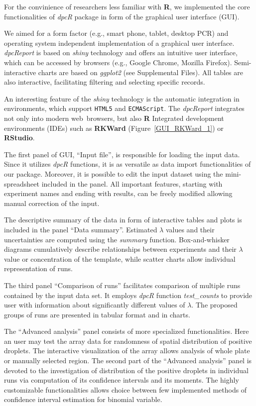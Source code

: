 \documentclass[a4,center,fleqn]{NAR}
\begin{document}
For the convinience of researchers less familiar with \textbf{R}, we 
implemented the core functionalities of \textit{dpcR} package in form of 
the graphical user interface (GUI).

We aimed for a form factor (e.g., smart phone, tablet, desktop PCR) and 
operating system independent implementation of a graphical user interface. 
\textit{dpcReport} is based on \textit{shiny} technology and offers an intuitive 
user interface, which can be accessed by browsers (e.g., Google Chrome, Mozilla 
Firefox). Semi-interactive charts are based on \textit{ggplot2} (see 
Supplemental Files). All tables are also interactive, facilitating filtering 
and selecting specific records.

An interesting feature of the \textit{shiny} technology is the automatic 
integration in environments, which support \texttt{HTML5} and 
\texttt{ECMAScript}. The \textit{dpcReport} integrates not only into modern 
web~browsers, but also \textbf{R} Integrated development environments (IDEs) 
such as \textbf{RKWard} (Figure~\ref{GUI_RKWard_1}) \cite{rodiger_rkward_2012} 
or \textbf{RStudio}.

The first panel of GUI, ``Input file'', is responsible for loading the input 
data. Since it utilizes \textit{dpcR} functions, it is as versatile as data 
import functionalities of our package. Moreover, it is possible to edit the 
input dataset using the mini-spreadsheet included in the panel. All important 
features, starting with experiment names and ending with results, can be freely 
modified allowing manual correction of the input.

The descriptive summary of the data in form of interactive tables and plots is 
included in the panel ``Data summary''. Estimated $\lambda$ values and their 
uncertainties are computed using the \textit{summary} function. Box-and-whisker 
diagrams cumulatively describe relationships between experiments and their 
$\lambda$ value or concentration of the template, while scatter charts allow 
individual representation of runs.

The third panel ``Comparison of runs'' facilitates comparison of multiple runs 
contained by the input data set. It employs \textit{dpcR} function 
\textit{test\_counts} to provide user with information about significantly 
different values of $\lambda$. The proposed groups of runs are presented in 
tabular format and in charts.

The ``Advanced analysis'' panel consists of more specialized 
functionalities. Here an user may test the array data for randomness of 
spatial distribution of positive droplets. The interactive visualization of the 
array allows analysis of whole plate or manually selected region. The second 
part of the ``Advanced analysis'' panel is devoted to the investigation of 
distribution of the positive droplets in individual runs via computation of 
its confidence intervals and its moments. The highly customizable 
functionalities allows choice between few implemented methods of confidence 
interval estimation for binomial variable.
\end{document}
